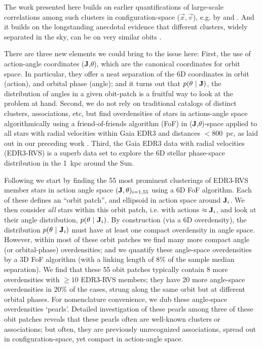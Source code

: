 \documentclass[twocolumn]{aastex631}
\begin{document}
The work presented here builds on earlier quantifications of large-scale correlations among such clusters in configuration-space ($\vec{x},\vec{v}$), e.g. by \citet{2017A&A...600A.106C} and \citet{2019AJ....158..122K}. And it builds on the longstanding anecdotal evidence that different clusters, widely separated in the sky, can be on very similar obits \citep[e.g.][]{1959Obs....79..143E}.

There are three new elements we could bring to the issue here: First, the use of action-angle coordinates ({\bf J},$\theta$), which are the canonical coordinates for orbit space. In particular, they offer a neat separation of the 6D coordinates in orbit (action), and orbital phase (angle); and it turns out that $p(\theta~|~{\bf J})$, the distribution of angles in a given obit-patch is a fruitful way to look at the problem at hand. Second, we do not rely on traditional catalogs of distinct clusters, associations, etc, but find overdensities of stars in actions-angle space algorithmically using a friend-of-friends algorithm (FoF) in ({\bf J},$\theta$)-space applied to all stars with radial velocities within Gaia EDR3 and distances $< 800$~pc, as laid out in our preceding work \citep{2020MNRAS.495.4098C}. Third, the Gaia EDR3 data with radial velocities (EDR3-RVS) is a superb data set to explore the 6D stellar phase-space distribution in the 1~kpc around the Sun.

Following \citet{2020MNRAS.495.4098C} we start by finding the 55 most prominent clusterings of EDR3-RVS member stars in action angle space $({\bf J},\theta)_{i=1,55}$ using a 6D FoF algorithm. Each of these defines an ``orbit patch'', and ellipsoid in action space around ${\bf J}_i$. We then consider \emph{all} stars within this orbit patch, i.e. with actions $\approx {\bf J}_i$, and look at their angle distribution, 
$p(\theta~|~{\bf J}_i)$. By construction (via a 6D overdensity), the distribution $p(\theta~|~{\bf J}_i)$ must have at least one compact overdensity in angle space. However, within most of these orbit patches we find many more compact angle (or orbital-phase) overdensities; and we quantify these angle-space overdensities by a 3D FoF algorithm (with a linking length of 8\% of the sample median separation). We find that these 55 obit patches typically contain 8 more overdensities with $\ge 10$ EDR3-RVS members; they have 20 more angle-space overdensities in 20\% of the cases, strung along the same orbit but at different orbital phases.
For nomenclature convenience, we dub these angle-space overdensities \textquoteleft pearls\textquoteright. Detailed investigation of these pearls among three of these obit patches reveals that these pearls often are well-known clusters or associations; but often, they are previously unrecognized associations, spread out in configuration-space, yet compact in action-angle space. 
\end{document}

